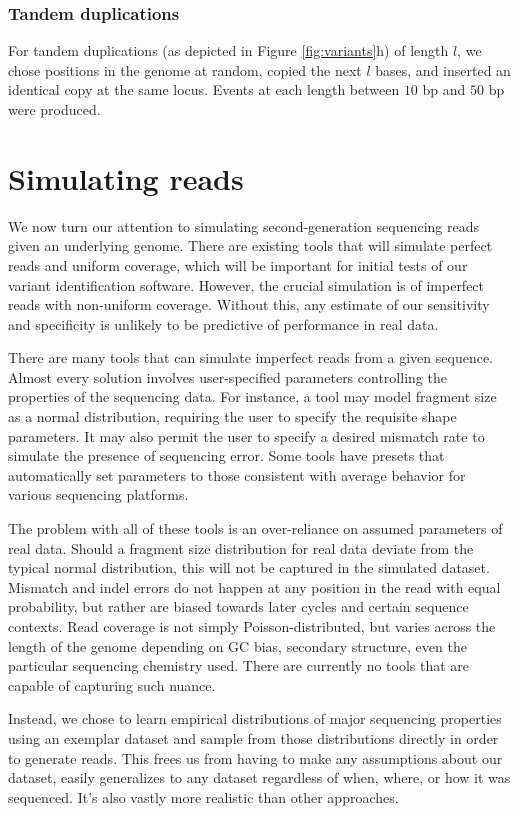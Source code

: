 \subsubsection{Tandem duplications}

For tandem duplications (as depicted in Figure \ref{fig:variants}h) of length $l$, we chose positions in the genome at random, copied the next $l$ bases, and inserted an identical copy at the same locus.  Events at each length between $10$ bp and $50$ bp were produced.

\section{Simulating reads}

We now turn our attention to simulating second-generation sequencing reads given an underlying genome.  There are existing tools that will simulate perfect reads and uniform coverage, which will be important for initial tests of our variant identification software.  However, the crucial simulation is of imperfect reads with non-uniform coverage.  Without this, any estimate of our sensitivity and specificity is unlikely to be predictive of performance in real data.

There are many tools that can simulate imperfect reads from a given sequence.  Almost every solution involves user-specified parameters controlling the properties of the sequencing data.  For instance, a tool may model fragment size as a normal distribution, requiring the user to specify the requisite shape parameters.  It may also permit the user to specify a desired mismatch rate to simulate the presence of sequencing error.  Some tools have presets that automatically set parameters to those consistent with average behavior for various sequencing platforms.

The problem with all of these tools is an over-reliance on assumed parameters of real data.  Should a fragment size distribution for real data deviate from the typical normal distribution, this will not be captured in the simulated dataset.  Mismatch and indel errors do not happen at any position in the read with equal probability, but rather are biased towards later cycles and certain sequence contexts.  Read coverage is not simply Poisson-distributed, but varies across the length of the genome depending on GC bias, secondary structure, even the particular sequencing chemistry used.  There are currently no tools that are capable of capturing such nuance.

Instead, we chose to learn empirical distributions of major sequencing properties using an exemplar dataset and sample from those distributions directly in order to generate reads.  This frees us from having to make any assumptions about our dataset, easily generalizes to any dataset regardless of when, where, or how it was sequenced.  It's also vastly more realistic than other approaches.

